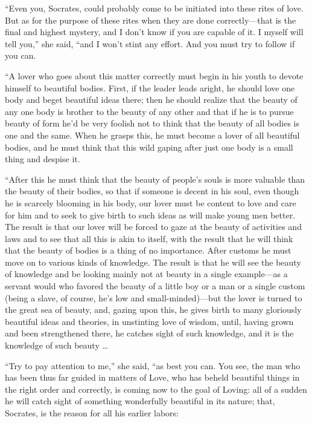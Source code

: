  “Even you, Socrates, could probably come to be initiated
into these rites of love. But as for the purpose of these rites when
they are done correctly---that is the final and highest mystery, and I
don’t know if you are capable of it. I myself will tell you,” she said,
“and I won’t stint any effort. And you must try to follow if you can.

“A lover who goes about this matter correctly must begin in his youth to
devote himself to beautiful bodies. First, if the
leader leads aright,
he should love one body and beget beautiful ideas there; then he should
 realize that the beauty of any one body is brother to the beauty
of any other and that if he is to pursue beauty of form he’d be very
foolish not to think that the beauty of all bodies is one and the same.
When he grasps this, he must become a lover of all beautiful bodies, and
he must think that this wild gaping after just one body is a small thing
and despise it.

“After this he must think that the beauty of people’s souls is more
valuable than the beauty of their bodies, so that if someone is decent
in  his soul, even though he is scarcely blooming in his body,
our lover must be content to love and care for him and to seek to give
birth to such ideas as will make young men better. The result is that
our lover will be forced to gaze at the beauty of activities and laws
and to see that all this is akin to itself, with the result that he will
think that the beauty of bodies is a thing of no importance. After
customs he must move on to various kinds of knowledge. The result is
that he will see the beauty of knowledge and  be looking mainly
not at beauty in a single example---as a servant would who favored the
beauty of a little boy or a man or a single custom (being a slave, of
course, he’s low and small-minded)---but the lover is turned to the
great sea of beauty, and, gazing upon this, he gives birth to many
gloriously beautiful ideas and theories, in unstinting love of
wisdom, until, having
grown and been strengthened there, he catches sight of such 
knowledge, and it is the knowledge of such beauty \ldots{}

“Try to pay attention to me,” she said, “as best you can. You see, the
man who has been thus far guided in matters of Love, who has beheld
beautiful things in the right order and correctly, is coming now to the
goal of Loving: all of a sudden he will catch sight of something
wonderfully beautiful in its nature; that, Socrates, is the reason for
all his earlier labors: 

